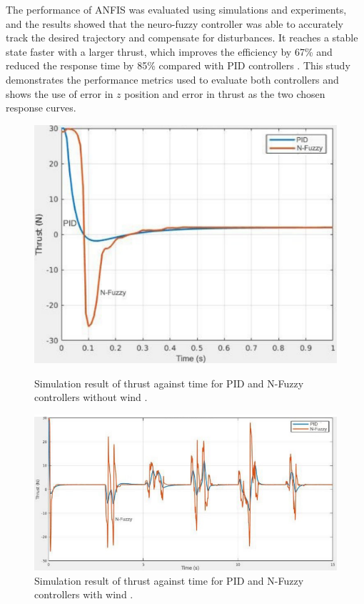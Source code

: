 The performance of ANFIS was evaluated using simulations and experiments, and the results showed that the neuro-fuzzy controller was able to accurately track the desired trajectory and compensate for disturbances. It reaches a stable state faster with a larger thrust, which improves the efficiency by 67\% and reduced the response time by 85\% compared with PID controllers \cite{boxi7}. This study demonstrates the performance metrics used to evaluate both controllers and shows the use of error in $z$ position and error in thrust as the two chosen response curves.   
\begin{figure}[H]
\centering
\begin{minipage}{.5\textwidth}
    \centering
    \includegraphics[width=0.95\linewidth]{img/Picture7.png}
    \caption[Simulation result of thrust against time for PID and N-Fuzzy controllers without wind.]{Simulation result of thrust against time for PID and N-Fuzzy controllers without wind \cite{boxi7}.}
    \label{fig:picture7}
\end{minipage}%
\begin{minipage}{.5\textwidth}
    \centering
    \includegraphics[width=0.95\linewidth]{img/Picture8.png}
    \caption[Simulation result of thrust against time for PID and N-Fuzzy controllers with wind.]{Simulation result of thrust against time for PID and N-Fuzzy controllers with wind \cite{boxi7}.}
    \label{fig:picture8}
\end{minipage}
\end{figure}
